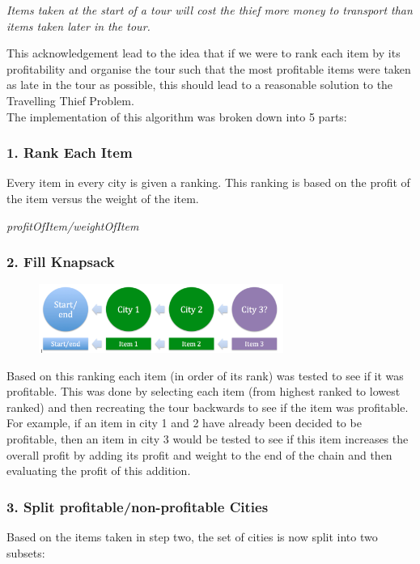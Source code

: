 \documentclass[a4paper,12pt]{article}
\begin{document}
\begin{center}
\emph{Items taken at the start of a tour will cost the thief more money to transport than items taken later in the tour.}
\end{center}

This acknowledgement lead to the idea that if we were to rank each item by its profitability and organise the tour such that the most profitable items were taken as late in the tour as possible, this should lead to a reasonable solution to the Travelling Thief Problem.\\
The implementation of this algorithm was broken down into 5 parts:

\subsubsection*{1. Rank Each Item}
Every item in every city is given a ranking. This ranking is based on the profit of the item versus the weight of the item.
\begin{center}
\emph{profitOfItem/weightOfItem}
\end{center}

\subsubsection*{2. Fill Knapsack}
\begin{figure}[h]
\centering
\includegraphics[width=80mm]{AddItem.png}
\end{figure}
Based on this ranking each item (in order of its rank) was tested to see if it was profitable. This was done by selecting each item (from highest ranked to lowest ranked) and then recreating the tour backwards to see if the item was profitable. For example, if an item in city 1 and 2 have already been decided to be profitable, then an item in city 3 would be tested to see if this item increases the overall profit by adding its profit and weight to the end of the chain and then evaluating the profit of this addition.

\subsubsection*{3. Split profitable/non-profitable Cities}
Based on the items taken in step two, the set of cities is now split into two subsets:
\end{document}
